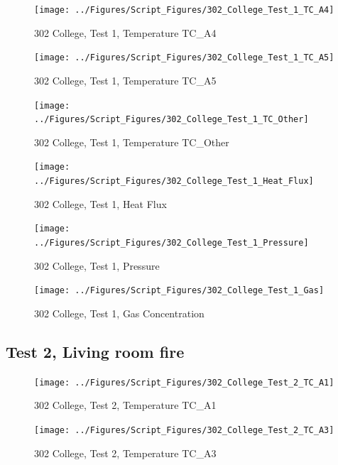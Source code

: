 \documentclass[12pt,oneside]{book}
\begin{document}
\begin{figure}[!ht]
\texttt{[image: ../Figures/Script\_Figures/302\_College\_Test\_1\_TC\_A4]}
\caption{302 College, Test 1, Temperature TC\_A4}
\label{fig:302_College_Test_1_TC_A4}
\end{figure}

\begin{figure}[!ht]
\texttt{[image: ../Figures/Script\_Figures/302\_College\_Test\_1\_TC\_A5]}
\caption{302 College, Test 1, Temperature TC\_A5}
\label{fig:302_College_Test_1_TC_A5}
\end{figure}

\begin{figure}[!ht]
\texttt{[image: ../Figures/Script\_Figures/302\_College\_Test\_1\_TC\_Other]}
\caption{302 College, Test 1, Temperature TC\_Other}
\label{fig:302_College_Test_1_TC_Other}
\end{figure}

\begin{figure}[!ht]
\texttt{[image: ../Figures/Script\_Figures/302\_College\_Test\_1\_Heat\_Flux]}
\caption{302 College, Test 1, Heat Flux}
\label{fig:302_College_Test_1_Heat_Flux}
\end{figure}

\begin{figure}[!ht]
\texttt{[image: ../Figures/Script\_Figures/302\_College\_Test\_1\_Pressure]}
\caption{302 College, Test 1, Pressure}
\label{fig:302_College_Test_1_Pressure}
\end{figure}

\begin{figure}[!ht]
\texttt{[image: ../Figures/Script\_Figures/302\_College\_Test\_1\_Gas]}
\caption{302 College, Test 1, Gas Concentration}
\label{fig:302_College_Test_1_Gas}
\end{figure}


\clearpage


\subsection{Test 2, Living room fire}

\begin{figure}[!ht]
\texttt{[image: ../Figures/Script\_Figures/302\_College\_Test\_2\_TC\_A1]}
\caption{302 College, Test 2, Temperature TC\_A1}
\label{fig:302_College_Test_2_TC_A1}
\end{figure}

\begin{figure}[!ht]
\texttt{[image: ../Figures/Script\_Figures/302\_College\_Test\_2\_TC\_A3]}
\caption{302 College, Test 2, Temperature TC\_A3}
\label{fig:302_College_Test_2_TC_A3}
\end{figure}
\end{document}
